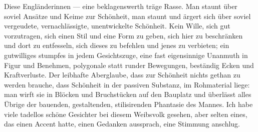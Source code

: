 Diese Engländerinnen — eine beklagenswerth träge Rasse. Man staunt über soviel Ansätze und Keime zur Schönheit, man staunt und ärgert sich über soviel vergeudete, vernachlässigte, unentwickelte Schönheit. Kein Wille, sich gut vorzutragen, sich einen Stil und eine Form zu geben, sich hier zu beschränken und dort zu entfesseln, sich dieses zu befehlen und jenes zu verbieten; ein gutwilliges stumpfes  in jedem Gesichtszuge, eine fast eigensinnige Unanmuth in Figur und Benehmen, polygonale statt runder Bewegungen, beständig Ecken und Kraftverluste. Der leibhafte Aberglaube, dass zur Schönheit nichts gethan zu werden brauche, dass Schönheit in der passiven Substanz, im Rohmaterial liege: man wirft sie in Blöcken und Bruchstücken auf den Bauplatz und überlässt alles Übrige der bauenden, gestaltenden, stilisirenden Phantasie des Mannes. Ich habe viele tadellos schöne Gesichter bei diesem Weibsvolk gesehen, aber selten eines, das einen Accent hatte, einen Gedanken aussprach, eine Stimmung anschlug.
\par

